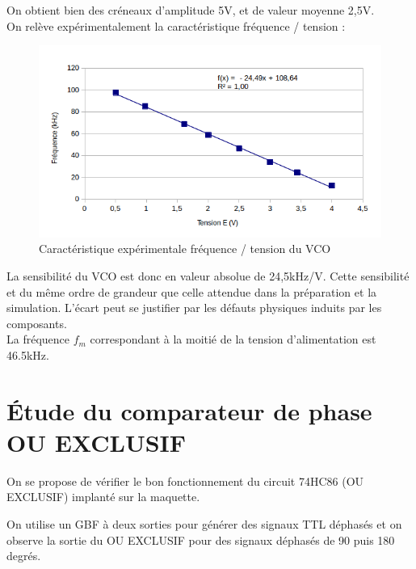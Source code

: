\documentclass[../../Cours_M1.tex]{subfiles}
\begin{document}
On obtient bien des créneaux d'amplitude 5V, et de valeur moyenne 2,5V.\\

\newpage
On relève expérimentalement la caractéristique fréquence / tension :

\begin{figure}[h!]
\centering
\includegraphics[scale=0.6]{AATC/carac.png}
\caption{Caractéristique expérimentale fréquence / tension du VCO}
\end{figure}

La sensibilité du VCO est donc en valeur absolue de 24,5kHz/V. Cette sensibilité et du même ordre de grandeur que celle attendue dans la préparation et la simulation. L'écart peut se justifier par les défauts physiques induits par les composants.\\

La fréquence $f_m$ correspondant à la moitié de la tension d'alimentation est 46.5kHz.

\newpage
\section{Étude du comparateur de phase OU EXCLUSIF}
On se propose de vérifier le bon fonctionnement du circuit 74HC86 (OU EXCLUSIF) implanté sur la maquette.

On utilise un GBF à deux sorties pour générer des signaux TTL déphasés et on observe la sortie du OU EXCLUSIF pour des signaux déphasés de 90 puis 180 degrés.
\end{document}
